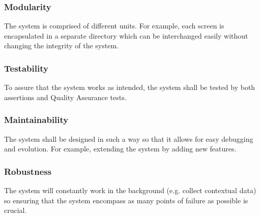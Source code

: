         \subsubsection{Modularity}
        The system is comprised of different units. For example, each screen is encapsulated in a separate directory which can be interchanged easily without changing the integrity of the system.  
        
        \subsubsection{Testability}
        To assure that the system works as intended, the system shall be tested by both assertions and Quality Assurance tests. 
        
        \subsubsection{Maintainability}
        The system shall be designed in such a way so that it allows for easy debugging and evolution. For example, extending the system by adding new features.
        
        \subsubsection{Robustness}
        The system will constantly work in the background (e.g. collect contextual data) so ensuring that the system encompass as many points of failure as possible is crucial.
    
    
    